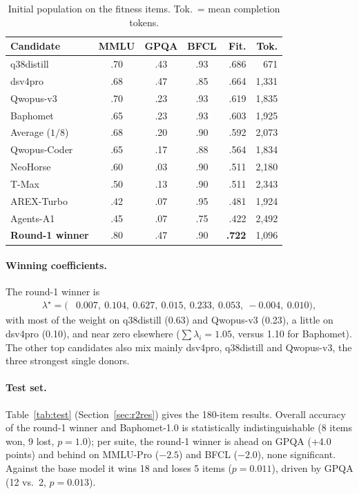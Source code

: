 \documentclass[10pt,a4paper]{article}
\begin{document}
\begin{table}[htbp]
\centering\small
\caption{Initial population on the fitness items. Tok.\ = mean completion tokens.}
\label{tab:init}
\begin{tabular}{lcccrr}
\toprule
Candidate & MMLU & GPQA & BFCL & Fit. & Tok. \\
\midrule
q38distill & .70 & .43 & .93 & .686 & 671 \\
dsv4pro & .68 & .47 & .85 & .664 & 1{,}331 \\
Qwopus-v3 & .70 & .23 & .93 & .619 & 1{,}835 \\
Baphomet & .65 & .23 & .93 & .603 & 1{,}925 \\
Average ($1/8$) & .68 & .20 & .90 & .592 & 2{,}073 \\
Qwopus-Coder & .65 & .17 & .88 & .564 & 1{,}834 \\
NeoHorse & .60 & .03 & .90 & .511 & 2{,}180 \\
T-Max & .50 & .13 & .90 & .511 & 2{,}343 \\
AREX-Turbo & .42 & .07 & .95 & .481 & 1{,}924 \\
Agents-A1 & .45 & .07 & .75 & .422 & 2{,}492 \\
\midrule
\textbf{Round-1 winner} & .80 & .47 & .90 & \textbf{.722} & 1{,}096 \\
\bottomrule
\end{tabular}
\end{table}

\paragraph{Winning coefficients.} The round-1 winner is \begin{align*}\lambda^\star = (&0.007,\ 0.104,\ 0.627,\ 0.015,\ 0.233,\ 0.053,\ -0.004,\ 0.010),\end{align*} with most of the weight on q38distill (0.63) and Qwopus-v3 (0.23), a little on dsv4pro (0.10), and near zero elsewhere ($\sum\lambda_i=1.05$, versus 1.10 for Baphomet). The other top candidates also mix mainly dsv4pro, q38distill and Qwopus-v3, the three strongest single donors.

\paragraph{Test set.} Table~\ref{tab:test} (Section~\ref{sec:r2res}) gives the 180-item results. Overall accuracy of the round-1 winner and Baphomet-1.0 is statistically indistinguishable (8 items won, 9 lost, $p=1.0$); per suite, the round-1 winner is ahead on GPQA (+4.0 points) and behind on MMLU-Pro ($-2.5$) and BFCL ($-2.0$), none significant. Against the base model it wins 18 and loses 5 items ($p=0.011$), driven by GPQA (12 vs.\ 2, $p=0.013$).
\end{document}
